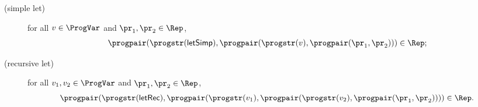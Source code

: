 \begin{description}
\item[\quad(simple let)] for all $v\in\ProgVar$ and
  $\pr_1,\pr_2\in\Rep$,
  \begin{displaymath}
    \progpair(\progstr(\mathsf{letSimp}),
    \progpair(\progstr(v),
    \progpair(\pr_1, \pr_2))) \in \Rep ;
  \end{displaymath}

\item[\quad(recursive let)] for all $v_1,v_2\in\ProgVar$ and
  $\pr_1,\pr_2\in\Rep$,
  \begin{displaymath}
    \progpair(\progstr(\mathsf{letRec}),
    \progpair(\progstr(v_1),
    \progpair(\progstr(v_2),
    \progpair(\pr_1, \pr_2)))) \in \Rep .
  \end{displaymath}
\end{description}

